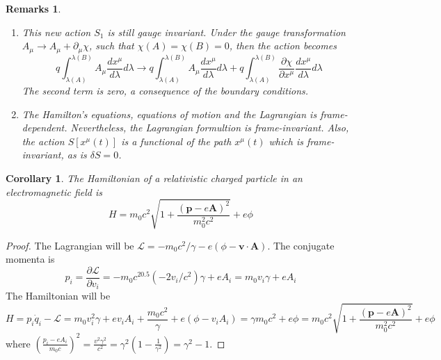 \documentclass[a4paper]{article}
\newtheorem{remarks}{Remarks}[section]
\theoremstyle{new}
\newtheorem{cor}{Corollary}[section]
\begin{document}
\begin{remarks}\leavevmode
\begin{enumerate}
\item This new action $S_1$ is still gauge invariant. Under the gauge transformation $A_\mu\rightarrow A_\mu+\partial_\mu\chi$,  such that $\chi(A)=\chi(B)=0$, then the action becomes
$$q\int_{\lambda(A)}^{\lambda(B)}A_\mu\frac{dx^\mu}{d\lambda}d\lambda\rightarrow q\int_{\lambda(A)}^{\lambda(B)}A_\mu\frac{dx^\mu}{d\lambda}d\lambda+q\int_{\lambda(A)}^{\lambda(B)}\frac{\partial\chi}{\partial x^\mu}\frac{dx^\mu}{d\lambda}d\lambda$$
The second term is zero, a consequence of the boundary conditions. 
\item The Hamilton's equations, equations of motion and the Lagrangian is frame-dependent. Nevertheless, the Lagrangian formultion is frame-invariant. Also, the action $S[x^\mu(t)]$ is a functional of the path $x^\mu(t)$ which is frame-invariant, as is $\delta S=0$.
\end{enumerate}
\end{remarks}
\begin{cor}
The Hamiltonian of a relativistic charged particle in an electromagnetic field is
$$H=m_0c^2\sqrt{1+\frac{(\mathbf{p}-e\mathbf{A})^2}{m_0^2c^2}}+e\phi$$
\end{cor}
\begin{proof}
The Lagrangian will be $\mathcal{L}=-m_0c^2/\gamma-e(\phi-\mathbf{v}\cdot\mathbf{A})$. The conjugate momenta is
$$p_i=\frac{\partial\mathcal{L}}{\partial v_i}=-m_0c^20.5(-2v_i/c^2)\gamma+eA_i=m_0v_i\gamma+eA_i$$
The Hamiltonian will be
$$H=p_i\dot{q}_i-\mathcal{L}=m_0v_i^2\gamma+ev_iA_i+\frac{m_0c^2}{\gamma}+e(\phi-v_iA_i)=\gamma m_0c^2+e\phi=m_0c^2\sqrt{1+\frac{(\mathbf{p}-e\mathbf{A})^2}{m_0^2c^2}}+e\phi$$
where $(\frac{p_i-eA_i}{m_0c})^2=\frac{v^2\gamma^2}{c^2}=\gamma^2(1-\frac{1}{\gamma^2})=\gamma^2-1$.
\end{proof}
\end{document}
